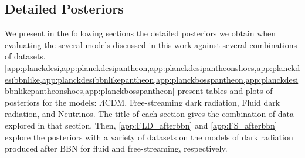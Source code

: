 \documentclass[aps,prd,twocolumn,notitlepage,
superscriptaddress,
nofootinbib,floatfix]{revtex4-2}
\begin{document}
\begin{widetext}
\section{Detailed Posteriors}\label{app:posteriors}

We present in the following sections the detailed posteriors we obtain when evaluating the several models discussed in this work against several combinations of datasets. \cref{app:planckdesi,app:planckdesipantheon,app:planckdesipantheonshoes,app:planckdesibbnlike,app:planckdesibbnlikepantheon,app:planckbosspantheon,app:planckdesibbnlikepantheonshoes,app:planckbosspantheon} present tables and plots of posteriors for the models: $\Lambda$CDM, Free-streaming dark radiation, Fluid dark radiation, and Neutrinos. The title of each section gives the combination of data explored in that section. Then, \cref{app:FLD_afterbbn} and \cref{app:FS_afterbbn} explore the posteriors with a variety of datasets on the models of dark radiation produced after BBN for fluid and free-streaming, respectively.




\end{widetext}
\end{document}
